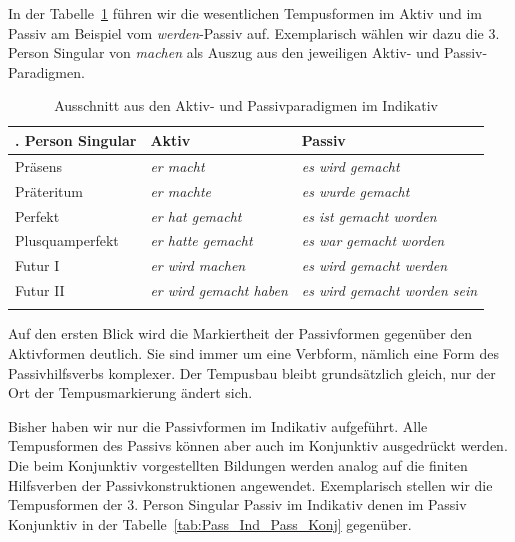 In der Tabelle~\ref{tab:Akt_Pass_Indikativ} führen wir die wesentlichen Tempusformen im Aktiv und im Passiv am Beispiel vom \textit{werden}-Passiv auf. Exemplarisch wählen wir dazu die 3. Person Singular von \textit{machen} als Auszug aus den jeweiligen Aktiv- und Passiv-Paradigmen.

\begin{table}
  \centering
  \begin{tabular}{l l l}
    \lsptoprule
    3. Person Singular & Aktiv & Passiv \\
    \hline
    Präsens & \textit{er macht}  & \textit{es wird gemacht} \\
    
    Präteritum & \textit{er machte}  & \textit{es wurde gemacht} \\
    
    Perfekt & \textit{er hat gemacht} & \textit{es ist gemacht worden} \\
    
    Plusquamperfekt & \textit{er hatte gemacht} & \textit{es war gemacht worden}\\ 
    
    Futur I & \textit{er wird machen} & \textit{es wird gemacht werden}\\
    
    Futur II & \textit{er wird gemacht haben} & \textit{es wird gemacht worden sein}\\
    \lspbottomrule 
  \end{tabular}
  \caption{Ausschnitt aus den Aktiv- und Passivparadigmen im Indikativ}
  \label{tab:Akt_Pass_Indikativ}
\end{table}

Auf den ersten Blick wird die Markiertheit der Passivformen gegenüber den Aktivformen deutlich. Sie sind immer um eine Verbform, nämlich eine Form des Passivhilfsverbs komplexer. Der Tempusbau bleibt grundsätzlich gleich, nur der Ort der Tempusmarkierung ändert sich.

Bisher haben wir nur die Passivformen im Indikativ aufgeführt. Alle Tempusformen des Passivs können aber auch im Konjunktiv ausgedrückt werden. Die beim Konjunktiv vorgestellten Bildungen werden analog auf die finiten Hilfsverben der Passivkonstruktionen angewendet. Exemplarisch stellen wir die Tempusformen der 3. Person Singular Passiv im Indikativ denen im Passiv Konjunktiv in der Tabelle~\ref{tab:Pass_Ind_Pass_Konj} gegenüber.   

